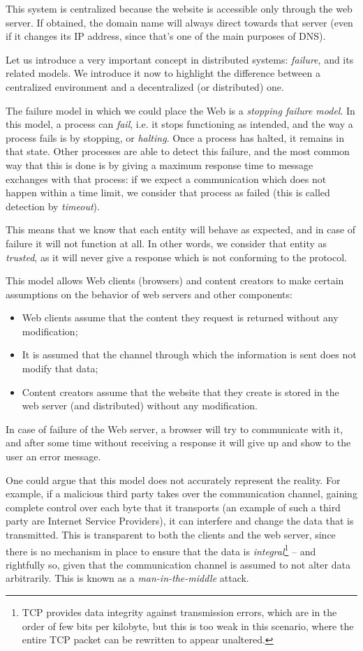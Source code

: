 \documentclass[mscthesis]{usiinfthesis}
\begin{document}
This system is centralized because the website is accessible only through the web server. If obtained, the domain name will always direct towards that server (even if it changes its IP address, since that's one of the main purposes of DNS).

Let us introduce a very important concept in distributed systems: \emph{failure}, and its related models.
We introduce it now to highlight the difference between a centralized environment and a decentralized (or distributed) one.

The failure model in which we could place the Web is a \emph{stopping failure model}.
In this model, a process can \emph{fail}, i.e. it stops functioning as intended, and the way a process fails is by stopping, or \textit{halting}. Once a process has halted, it remains in that state. Other processes are able to detect this failure, and the most common way that this is done is by giving a maximum response time to message exchanges with that process: if we expect a communication which does not happen within a time limit, we consider that process as failed (this is called detection by \textit{timeout}).

This means that we know that each entity will behave as expected, and in case of failure it will not function at all. In other words, we consider that entity as \emph{trusted}, as it will never give a response which is not conforming to the protocol.

This model allows Web clients (browsers) and content creators to make certain assumptions on the behavior of web servers and other components:
\begin{itemize}
	\item Web clients assume that the content they request is returned without any modification;
	\item It is assumed that the channel through which the information is sent does not modify that data;
	\item Content creators assume that the website that they create is stored in the web server (and distributed) without any modification.
\end{itemize}
In case of failure of the Web server, a browser will try to communicate with it, and after some time without receiving a response it will give up and show to the user an error message.

One could argue that this model does not accurately represent the reality. For example, if a malicious third party takes over the communication channel, gaining complete control over each byte that it transports (an example of such a third party are Internet Service Providers), it can interfere and change the data that is transmitted. This is transparent to both the clients and the web server, since there is no mechanism in place to ensure that the data is \textit{integral}\footnote{TCP provides data integrity against transmission errors, which are in the order of few bits per kilobyte, but this is too weak in this scenario, where the entire TCP packet can be rewritten to appear unaltered.} -- and rightfully so, given that the communication channel is assumed to not alter data arbitrarily. This is known as a \textit{man-in-the-middle} attack.
\end{document}
